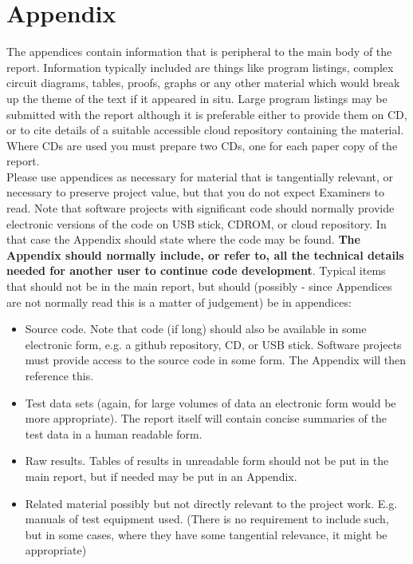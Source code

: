 \section{Appendix}
The appendices contain information
that is peripheral to the main body of the report.
Information typically included are things like
program listings, complex circuit diagrams,
tables, proofs, graphs or any other material
which would break up the theme of the text if it
appeared in situ. Large program listings may be
submitted with the report although it is
preferable either to provide them on CD, or to
cite details of a suitable accessible cloud
repository containing the material. Where CDs
are used you must prepare two CDs, one for each
paper copy of the report.\\ \newline \noindent Please use 
appendices as necessary for material that
is tangentially relevant, or necessary to preserve
project value, but that you do not expect Examiners to
read. Note that software projects with significant code
should normally provide electronic versions of the
code on USB stick, CDROM, or cloud repository. In
that case the Appendix should state where the code
may be found. \textbf{The Appendix should normally
include, or refer to, all the technical details needed
for another user to continue code development}.
Typical items that should not be in the main report,
but should (possibly - since Appendices are not
normally read this is a matter of judgement) be in
appendices:
\begin{itemize}
    \item Source code. Note that code (if long) should
    also be available in some electronic form, e.g. a github repository, CD, or USB 
    stick. Software
    projects must provide access to the source
    code in some form. The Appendix will then
    reference this.
    \item Test data sets (again, for large volumes of
    data an electronic form would be more
    appropriate). The report itself will contain
    concise summaries of the test data in a
    human readable form.
    \item Raw results. Tables of results in unreadable
    form should not be put in the main report, but
    if needed may be put in an Appendix.
    \item Related material possibly but not directly
    relevant to the project work. E.g. manuals of
    test equipment used. (There is no
    requirement to include such, but in some
    cases, where they have some tangential
    relevance, it might be appropriate)
\end{itemize}
